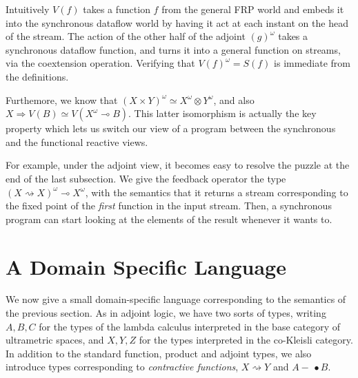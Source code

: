 \documentclass[nocopyrightspace,preprint]{sigplanconf}
\newcommand{\To}{\Rightarrow}
\newcommand{\shrink}{\rightsquigarrow}
\newcommand{\lolli}{\multimap}
\newcommand{\lollishrink}{-\!\!\!\,\bullet}
\begin{document}
Intuitively $V(f)$ takes a function $f$ from the general FRP world and
embeds it into the synchronous dataflow world by having it act at each
instant on the head of the stream. The action of the other half of the
adjoint $(g)^\omega$ takes a synchronous dataflow function, and turns
it into a general function on streams, via the coextension operation. 
Verifying that $V(f)^\omega = S(f)$ is immediate from the definitions. 

Furthemore, we know that $(X \times Y)^\omega \simeq X^\omega \otimes Y^\omega$, and
also $X \To V(B) \simeq V(X^\omega \lolli B)$. This latter
isomorphism is actually the key property which lets us switch our view
of a program between the synchronous and the functional reactive
views.

For example, under the adjoint view, it becomes easy to resolve the
puzzle at the end of the last subsection. We give the feedback
operator the type $(X \shrink X)^\omega \lolli X^\omega$, with
the semantics that it returns a stream corresponding to the fixed
point of the \emph{first} function in the input stream. Then, a
synchronous program can start looking at the elements of the
result whenever it wants to.

\section{A Domain Specific Language}

We now give a small domain-specific language
corresponding to the semantics of the previous section. As in adjoint
logic, we have two sorts of types, writing $A,B,C$ for the types of
the lambda calculus interpreted in the base category of ultrametric
spaces, and $X,Y,Z$ for the types interpreted in the co-Kleisli
category. In addition to the standard function, product and adjoint
types, we also introduce types corresponding to \emph{contractive
  functions}, $X \shrink Y$ and $A \lollishrink B$.
\end{document}
